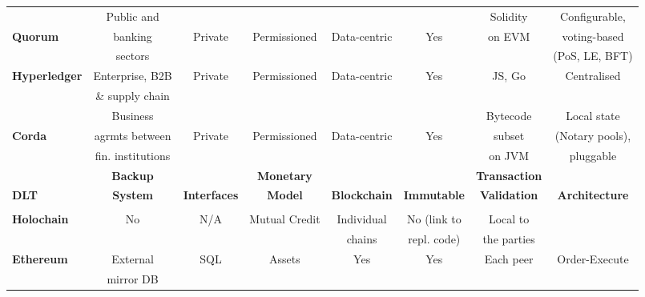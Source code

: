 \begin{table}
\begin{centering}
{\begin{tabular}{| l | c | c | c | c | c | c | c |}
				&Public and  			&			&				&			&		&Solidity
				&Configurable,				\\
\textbf{Quorum} 	&banking  			&Private		&Permissioned		&Data-centric	&Yes		&on EVM
				&voting-based 				\\
			 	&sectors				&			&				&			&		&
				&(PoS, LE, BFT)					\\
\hline
\textbf{Hyperledger}	&Enterprise, B2B		&Private		&Permissioned		&Data-centric	&Yes		&JS, Go
				&Centralised 			\\
 				& \& supply chain		&			&				&			&		&
				& 					\\
\hline
				&Business	 		&			&				&			&		&Bytecode
				&Local state			\\
\textbf{Corda} 		&agrmts between			&Private		&Permissioned		&Data-centric	&Yes		&subset
				&(Notary pools),			\\
		 		&fin. institutions			&			&				&			&		&on JVM
				&pluggable			\\
\hline
\hline
\hline
\hline
				& \textbf{Backup} 		& \textbf{}				&\textbf{Monetary}
				& \textbf{}  			& \textbf{}  			& \textbf{Transaction} 	& \\
\textbf{DLT}		& \textbf{System} 		& \textbf{Interfaces}		&\textbf{Model} 
				& \textbf{Blockchain} 	& \textbf{Immutable} 		& \textbf{Validation} 		& \textbf{Architecture} \\
				& \textbf{} 				& \textbf{}				&\textbf{}
				& \textbf{} 				& \textbf{} 				& \textbf{} 				&\\
\hline
\hline
\textbf{Holochain}	&No			&N/A				&Mutual Credit
				&Individual	&No (link to		&Local to	& \\
				&			&				& 
				&chains 		&repl. code)		&the parties		& \\
\hline
\textbf{Ethereum}	&External		&SQL			&Assets 
				&Yes			&Yes				&Each peer		&Order-Execute \\
				&mirror DB	&				& 
				& 			&				&				& \\
\hline


\end{tabular}}
\end{centering}
\end{table}
